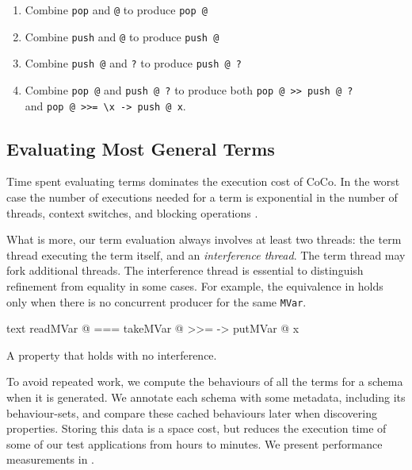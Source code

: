 \begin{enumerate}
\item Combine \verb|pop| and \verb|@| to produce \verb|pop @|
\item Combine \verb|push| and \verb|@| to produce \verb|push @|
\item Combine \verb|push @| and \verb|?| to produce \verb|push @ ?|
\item Combine \verb|pop @| and \verb|push @ ?| to produce both
  \verb|pop @ >> push @ ?|\\and \verb|pop @ >>= \x -> push @ x|.
\end{enumerate}


\subsection{Evaluating Most General Terms}
\label{sec:coco-hiw-eval}

Time spent evaluating terms dominates the execution cost of CoCo.  In
the worst case the number of executions needed for a term is
exponential in the number of threads, context switches, and blocking
operations \parencite{musuvathi2007}.

What is more, our term evaluation always involves at least two
threads: the term thread executing the term itself, and an
\emph{interference thread}.  The term thread may fork additional
threads.  The interference thread is essential to distinguish
refinement from equality in some cases.  For example, the equivalence
in  holds only when there is no concurrent
producer for the same \verb|MVar|.

\begin{listing}
\centering
\begin{cminted}{text}
readMVar @  ===  takeMVar @ >>= \x -> putMVar @ x
\end{cminted}
\caption{A property that holds with no interference.}\label{lst:prop_mvar3}
\end{listing}

To avoid repeated work, we compute the behaviours of all the terms for
a schema when it is generated.  We annotate each schema with some
metadata, including its behaviour-sets, and compare these cached
behaviours later when discovering properties.  Storing this data is a
space cost, but reduces the execution time of some of our test
applications from hours to minutes.  We present performance
measurements in .


